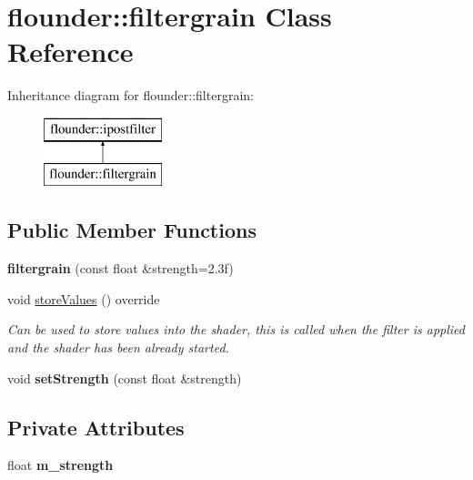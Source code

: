 \hypertarget{classflounder_1_1filtergrain}{}\section{flounder\+:\+:filtergrain Class Reference}
\label{classflounder_1_1filtergrain}
Inheritance diagram for flounder\+:\+:filtergrain\+:\begin{figure}[H]
\begin{center}
\leavevmode
\includegraphics[height=2.000000cm]{classflounder_1_1filtergrain}
\end{center}
\end{figure}
\subsection*{Public Member Functions}
\begin{DoxyCompactItemize}
\item 
\mbox{\label{classflounder_1_1filtergrain_af0bb7e5b22fdb0ff451f66c2ee489bd5}} 
{\bfseries filtergrain} (const float \&strength=2.\+3f)
\item 
void \hyperlink{classflounder_1_1filtergrain_a0f65f9e8b994f18a4777e4451bdf8b4e}{store\+Values} () override
\begin{DoxyCompactList}\small\item\em Can be used to store values into the shader, this is called when the filter is applied and the shader has been already started. \end{DoxyCompactList}\item 
\mbox{\label{classflounder_1_1filtergrain_ac6f764272481963353642bd7b3d4f746}} 
void {\bfseries set\+Strength} (const float \&strength)
\end{DoxyCompactItemize}
\subsection*{Private Attributes}
\begin{DoxyCompactItemize}
\item 
\mbox{\label{classflounder_1_1filtergrain_a038e33f9dd08809f8242d67336ad4483}} 
float {\bfseries m\+\_\+strength}
\end{DoxyCompactItemize}

